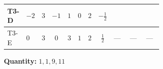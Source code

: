 \documentclass[8pt]{article}
\begin{document}
\begin{landscape}
\begin{longtable}{@{}llcccccc >{\raggedright\arraybackslash}p{0.21\linewidth} >{\raggedright\arraybackslash}p{0.21\linewidth} >{\raggedright\arraybackslash}p{0.21\linewidth}@{}}
T3-D & $-2$ & $3$ & $-1$ & $1$ & $0$ & $2$ & $-\frac{1}{2}$ & \scriptsize\adjustbox{max width=\linewidth}{$\begin{gathered} - \frac{11 \cdot 3^{\frac{3}{4}} i g_{2}^{2} \overline{y_{1}} \overline{y_{2}}}{8 MF}\end{gathered}$} & \scriptsize\adjustbox{max width=\linewidth}{$\begin{gathered} - \frac{3^{\frac{3}{4}} i lambda12Inv1 \overline{y_{1}} \overline{y_{2}}}{6 MF}\end{gathered}$} & \scriptsize\adjustbox{max width=\linewidth}{$\begin{gathered} - \frac{3^{\frac{3}{4}} i g_{1}^{2} \overline{y_{1}} \overline{y_{2}}}{8 MF}\end{gathered}$} \\
\midrule
T3-E & $0$ & $3$ & $0$ & $3$ & $1$ & $2$ & $\frac{1}{2}$ & --- & --- & --- \\
\midrule
\bottomrule
\end{longtable}
\clearpage
\noindent\textbf{Quantity: }$\mathrm{1,1,9,11}$\par\smallskip

\end{landscape}
\end{document}
